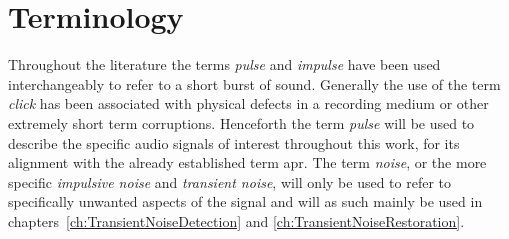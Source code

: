 %


\section{Terminology}
Throughout the literature the terms \emph{pulse}\cite{Esquef2002a}\cite{Esquef2003a} and \emph{impulse}\cite{Czyzewski1995}\cite{Kauppinen2002a}\cite{Chen2000} have been used interchangeably to refer to a short burst of sound. Generally the use of the term \emph{click}\cite{Czyzewski1995}\cite{Esquef2002}\cite{Godsill1998book} has been associated with physical defects in a recording medium or other extremely short term corruptions. Henceforth the term \emph{pulse} will be used to describe the specific audio signals of interest throughout this work, for its alignment with the already established term \gls{apr}\cite{TouchSystems2006}. The term \emph{noise}, or the more specific \emph{impulsive noise} and \emph{transient noise}, will only be used to refer to specifically unwanted aspects of the signal and will as such mainly be used in chapters~\ref{ch:TransientNoiseDetection} and \ref{ch:TransientNoiseRestoration}.

